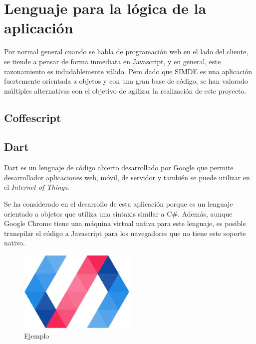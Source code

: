 
\section{Lenguaje para la lógica de la aplicación}
\label{3:sec1}

Por normal general cuando se habla de programación web en el lado del cliente, se tiende a pensar
de forma inmediata en Javascript, y en general, este razonamiento es indudablemente válido. 
Pero dado que SIMDE es una aplicación fuertemente orientada a objetos y con una gran base de código, 
se han valorado múltiples alternativas con el objetivo de agilizar la realización de este proyecto.

\subsection{Coffescript}

\subsection{Dart}

Dart es un lenguaje de código abierto desarrollado por Google que permite desarrollador aplicaciones web, móvil, 
de servidor y también se puede utilizar en el \textit{Internet of Things}. 

\bigskip
Se ha considerado en el desarrollo de esta aplicación porque es un lenguaje orientado a objetos que utiliza una 
sintaxis similar a C\#. Además, aunque Google Chrome tiene una máquina virtual nativa para este lenguaje, es posible
transpilar el código a Javascript para los navegadores que no tiene este soporte nativo.

\begin{figure}[!th]
\begin{center}
\includegraphics[width=0.5\textwidth]{images/cap3/polymerlogo.eps}
\caption{Ejemplo}
\label{fig:PolymerLogo}
\end{center}
\end{figure}

